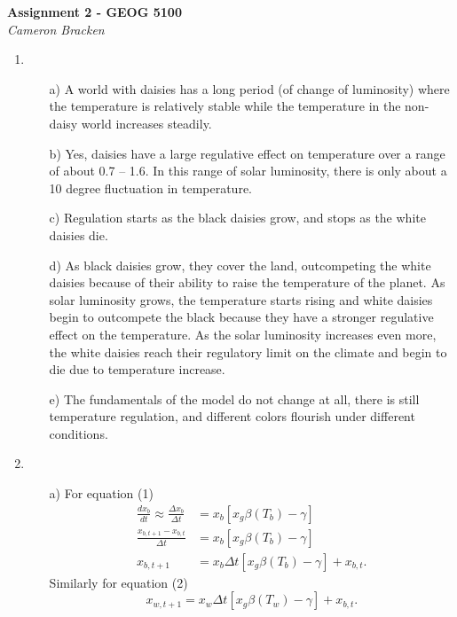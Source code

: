 \documentclass[11pt,oneside]{article}
\begin{document}
\begin{center}
	\textbf{Assignment 2 - GEOG 5100}\\
	{\itshape Cameron Bracken}
\end{center}


\begin{enumerate}
\item
\begin{enumerate}
	\item[a)] A world with daisies has a long period (of change of luminosity) where the temperature is relatively stable while the temperature in the non-daisy world increases steadily.

	\item[b)] Yes, daisies have a large regulative effect on temperature over a range of about 0.7 -- 1.6.  In this range of solar luminosity, there is only about a 10 degree fluctuation in temperature. 

	\item[c)] Regulation starts as the black daisies grow, and stops as the white daisies die. 

	\item[d)] As black daisies grow, they cover the land, outcompeting the white daisies because of their ability to raise the temperature of the planet. As solar luminosity grows, the temperature starts rising and white daisies begin to outcompete the black because they have a stronger regulative effect on the temperature. As the solar luminosity increases even more, the white daisies reach their regulatory limit on the climate and begin to die due to temperature increase. 

	\item[e)] The fundamentals of the model do not change at all, there is still temperature regulation, and different colors flourish under different conditions. 
\end{enumerate}

\item 
\begin{enumerate}
\item[a)] For equation (1)
\begin{align}
	\frac{dx_b}{dt} \approx 
	\frac{\Delta x_b}{\Delta t} & =
	x_b[ x_g \beta(T_b) - \gamma ]	\nonumber\\
%
	\frac{x_{b,t+1} - x_{b,t}}{\Delta t}&=
	x_b\left[ x_g \beta (T_b) - \gamma \right]\nonumber\\
%
	x_{b,t+1} &=
	x_b\Delta t\left[ x_g \beta(T_b) - \gamma \right] + x_{b,t}.\nonumber
\end{align}
Similarly for equation (2)
\[
	x_{w,t+1} =
	x_w\Delta t\left[ x_g \beta(T_w) - \gamma \right] + x_{b,t}.\nonumber
\]


\end{enumerate}
\end{enumerate}
\end{document}
